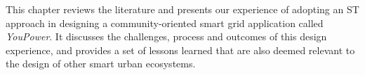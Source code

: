 This chapter reviews the literature and presents our experience of adopting an ST approach in designing a community-oriented smart grid application called \textit{YouPower}. It discusses the challenges, process and outcomes of this design experience, and provides a set of lessons learned that are also deemed relevant to the design of other smart urban ecosystems. 


